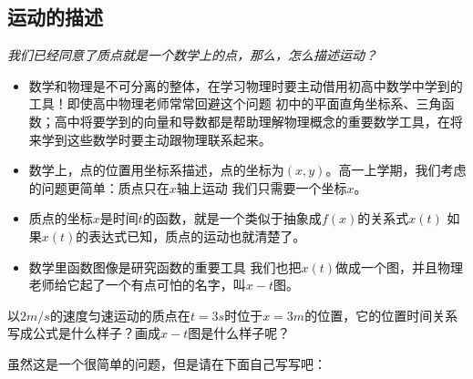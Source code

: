 \documentclass[a4paper,9pt]{ctexart}
\begin{document}
\subsection{运动的描述}
\emph{我们已经同意了质点就是一个数学上的点，那么，怎么描述运动？}
\begin{itemize}
\item
数学和物理是不可分离的整体，在学习物理时要主动借用初高中数学中学到的工具！即使高中物理老师常常回避这个问题 \so 初中的平面直角坐标系、三角函数；高中将要学到的向量和导数都是帮助理解物理概念的重要数学工具，在将来学到这些数学时要主动跟物理联系起来。
\item
数学上，点的位置用坐标系描述，点的坐标为$(x,y)$。高一上学期，我们考虑的问题更简单：质点只在$x$轴上运动 \so 我们只需要一个坐标$x$。
\item
质点的坐标$x$是时间$t$的函数，就是一个类似于抽象成$f(x)$的关系式$x(t)$ \so 如果$x(t)$的表达式已知，质点的运动也就清楚了。
\item
数学里函数图像是研究函数的重要工具 \so 我们也把$x(t)$做成一个图，并且物理老师给它起了一个有点可怕的名字，叫$x-t$图。
\end{itemize}
\begin{eg}
以$2\unit{m/s}$的速度匀速运动的质点在$t=3\unit{s}$时位于$x=3\unit{m}$的位置，它的位置时间关系写成公式是什么样子？画成$x-t$图是什么样子呢？
\end{eg}
\begin{ans}
虽然这是一个很简单的问题，但是请在下面自己写写吧：
\vspace{5cm}
\end{ans}
\end{document}
